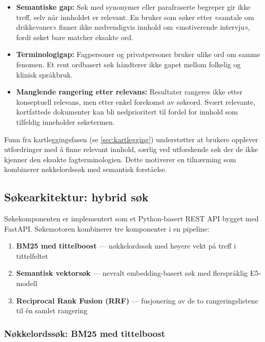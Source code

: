 \begin{itemize}
    \item \textbf{Semantiske gap:} Søk med synonymer eller parafraserte
          begreper gir ikke treff, selv når innholdet er relevant. En bruker
          som søker etter «samtale om drikkevaner» finner ikke nødvendigvis
          innhold om «motiverende intervju», fordi søket bare matcher eksakte
          ord.
    \item \textbf{Terminologigap:} Fagpersoner og privatpersoner bruker ulike
          ord om samme fenomen. Et rent ordbasert søk håndterer ikke gapet
          mellom folkelig og klinisk språkbruk.
    \item \textbf{Manglende rangering etter relevans:} Resultater rangeres
          ikke etter konseptuell relevans, men etter enkel forekomst av
          søkeord. Svært relevante, kortfattede dokumenter kan bli nedprioritert
          til fordel for innhold som tilfeldig inneholder søketermen.
\end{itemize}

Funn fra kartleggingsfasen (se \autoref{sec:kartlegging}) understøtter at
brukere opplever utfordringer med å finne relevant innhold, særlig ved
utforskende søk der de ikke kjenner den eksakte fagterminologien. Dette
motiverer en tilnærming som kombinerer nøkkelordssøk med semantisk forståelse.

\subsection{Søkearkitektur: hybrid søk}
\label{sec:soek-arkitektur}

Søkekomponenten er implementert som et Python-basert REST API bygget med
FastAPI. Søkemotoren kombinerer tre komponenter i en pipeline:

\begin{enumerate}
    \item \textbf{BM25 med tittelboost} --- nøkkelordssøk med høyere vekt på
          treff i tittelfeltet
    \item \textbf{Semantisk vektorsøk} --- nevralt embedding-basert søk med
          flerspråklig E5-modell
    \item \textbf{Reciprocal Rank Fusion (RRF)} --- fusjonering av de to
          rangeringslistene til én samlet rangering
\end{enumerate}

\subsubsection{Nøkkelordssøk: BM25 med tittelboost}
\label{sec:bm25-impl}

